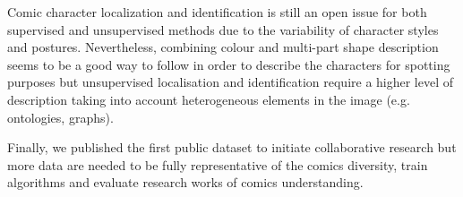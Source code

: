 Comic character localization and identification is still an open issue for both supervised and unsupervised methods due to the variability of character styles and postures.
Nevertheless, combining colour and multi-part shape description seems to be a good way to follow in order to describe the characters for spotting purposes but unsupervised localisation and identification require a higher level of description taking into account heterogeneous elements in the image (e.g. ontologies, graphs).

Finally, we published the first public dataset to initiate collaborative research but more data are needed to be fully representative of the comics diversity, train algorithms and evaluate research works of comics understanding.

